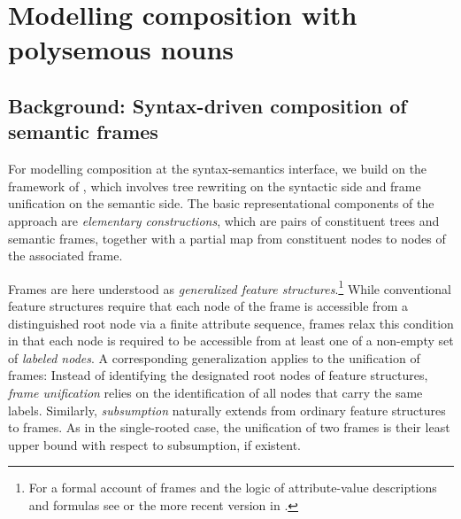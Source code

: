 \documentclass[output=paper,colorlinks,citecolor=brown,chinesefont]{langscibook}
\begin{document}
\section{Modelling composition with polysemous nouns}



\subsection{Background: Syntax-driven composition of semantic frames}

For modelling composition at the syntax-semantics interface, we build on the framework of \citet{kallmeyer2013syntax}, which involves tree rewriting on the syntactic side and frame unification on the semantic side.
The basic representational components of the approach are \emph{elementary constructions}, which are pairs of constituent trees and semantic frames, together with a partial map from constituent nodes to nodes of the associated frame.

Frames are here understood as \emph{generalized feature structures}.\footnote{%
For a formal account of frames and the logic of attribute-value descriptions and formulas see \citet[Sect.~3]{kallmeyer2013syntax} or the more recent version in \citet[Appendix]{chen2022frame}.}
While conventional feature structures require that each node of the frame is accessible from a distinguished root node via a finite attribute sequence, frames relax this condition in that each node is required to be accessible from at least one of a non-empty set of \emph{labeled nodes}. 
A corresponding generalization applies to the unification of frames:
Instead of identifying the designated root nodes of feature structures, \emph{frame unification} relies on the identification of all nodes that carry the same labels.
Similarly, \emph{subsumption} naturally extends from ordinary feature structures to frames.
As in the single-rooted case, the unification of two frames is their least upper bound with respect to subsumption, if existent.
\end{document}
